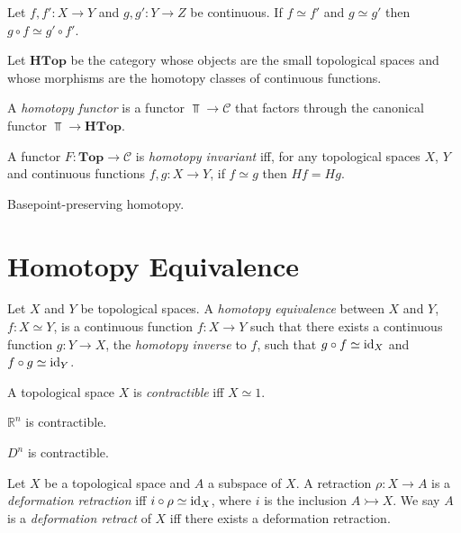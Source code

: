 \begin{prop}
Let $f,f' : X \rightarrow Y$ and $g,g' : Y \rightarrow Z$ be continuous. If $f \simeq f'$ and $g \simeq g'$ then $g \circ f \simeq g' \circ f'$.
\end{prop}

\begin{df}
Let $\mathbf{HTop}$ be the category whose objects are the small topological spaces and whose morphisms are the homotopy classes of continuous functions.

A \emph{homotopy functor} is a functor $\Top \rightarrow \mathcal{C}$ that factors through the canonical functor $\Top \rightarrow \mathbf{HTop}$.
\end{df}

\begin{df}
A functor $F : \mathbf{Top} \rightarrow \mathcal{C}$ is \emph{homotopy invariant} iff, for any topological spaces $X$, $Y$ and continuous functions $f,g : X \rightarrow Y$, if $f \simeq g$ then $Hf = Hg$.
\end{df}

Basepoint-preserving homotopy.

\section{Homotopy Equivalence}

\begin{df}
Let $X$ and $Y$ be topological spaces. A \emph{homotopy equivalence} between $X$ and $Y$, $f : X \simeq Y$, is a continuous function $f : X \rightarrow Y$ such that there exists a continuous function $g : Y \rightarrow X$, the \emph{homotopy inverse} to $f$, such that $g \circ f \simeq \mathrm{id}_{X}$ and $f \circ g \simeq \mathrm{id}_{Y}$.
\end{df}

\begin{df}[Contractible]
A topological space $X$ is \emph{contractible} iff $X \simeq 1$.
\end{df}

\begin{ex}
$\mathbb{R}^n$ is contractible.
\end{ex}

\begin{ex}
$D^n$ is contractible.
\end{ex}

\begin{df}
Let $X$ be a topological space and $A$ a subspace of $X$. A retraction $\rho : X \rightarrow A$ is a \emph{deformation retraction} iff $i \circ \rho \simeq \mathrm{id}_{X}$, where $i$ is the inclusion $A \rightarrowtail X$. We say $A$ is a \emph{deformation retract} of $X$ iff there exists a deformation retraction.
\end{df}

